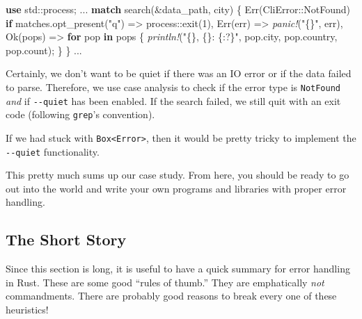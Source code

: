 \documentclass[a4paper,]{book}
\newenvironment{Shaded}{\begin{snugshade}}{\end{snugshade}}
\newcommand{\KeywordTok}[1]{\textcolor[rgb]{0.13,0.29,0.53}{\textbf{{#1}}}}
\newcommand{\DecValTok}[1]{\textcolor[rgb]{0.00,0.00,0.81}{{#1}}}
\newcommand{\ConstantTok}[1]{\textcolor[rgb]{0.00,0.00,0.00}{{#1}}}
\newcommand{\StringTok}[1]{\textcolor[rgb]{0.31,0.60,0.02}{{#1}}}
\newcommand{\PreprocessorTok}[1]{\textcolor[rgb]{0.56,0.35,0.01}{\textit{{#1}}}}
\newcommand{\NormalTok}[1]{{#1}}
\begin{document}
\begin{Shaded}
\begin{Highlighting}[]
\KeywordTok{use} \NormalTok{std::process;}
\NormalTok{...}
    \KeywordTok{match} \NormalTok{search(&data_path, city) \{}
        \ConstantTok{Err}\NormalTok{(CliError::NotFound) }\KeywordTok{if} \NormalTok{matches.opt_present(}\StringTok{"q"}\NormalTok{) => process::exit(}\DecValTok{1}\NormalTok{),}
        \ConstantTok{Err}\NormalTok{(err) => }\PreprocessorTok{panic!}\NormalTok{(}\StringTok{"\{\}"}\NormalTok{, err),}
        \ConstantTok{Ok}\NormalTok{(pops) => }\KeywordTok{for} \NormalTok{pop }\KeywordTok{in} \NormalTok{pops \{}
            \PreprocessorTok{println!}\NormalTok{(}\StringTok{"\{\}, \{\}: \{:?\}"}\NormalTok{, pop.city, pop.country, pop.count);}
        \NormalTok{\}}
    \NormalTok{\}}
\NormalTok{...}
\end{Highlighting}
\end{Shaded}

Certainly, we don't want to be quiet if there was an IO error or if the
data failed to parse. Therefore, we use case analysis to check if the
error type is \texttt{NotFound} \emph{and} if \texttt{-\/-quiet} has
been enabled. If the search failed, we still quit with an exit code
(following \texttt{grep}'s convention).

If we had stuck with \texttt{Box\textless{}Error\textgreater{}}, then it
would be pretty tricky to implement the \texttt{-\/-quiet}
functionality.

This pretty much sums up our case study. From here, you should be ready
to go out into the world and write your own programs and libraries with
proper error handling.

\hypertarget{the-short-story}{\subsection{The Short
Story}\label{the-short-story}}

Since this section is long, it is useful to have a quick summary for
error handling in Rust. These are some good ``rules of thumb.'' They are
emphatically \emph{not} commandments. There are probably good reasons to
break every one of these heuristics!
\end{document}
